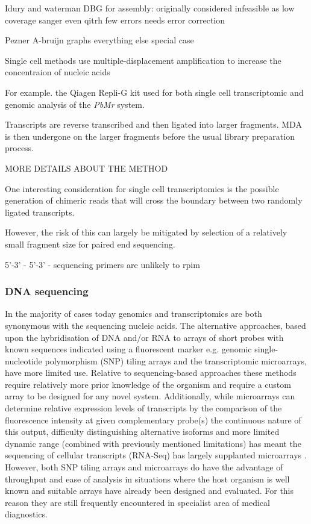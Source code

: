 Idury and waterman DBG for assembly: originally considered infeasible as low coverage
sanger even qitrh few errors needs error correction

Pezner A-bruijn graphs
everything else special case






Single cell methods use multiple-displacement amplification to increase the concentraion of
nucleic acids 

For example. the Qiagen Repli-G kit used for both single cell transcriptomic and genomic analysis
of the \textit{PbMr} system.

Transcripts are reverse transcribed and then ligated into larger fragments.  MDA
is then undergone on the larger fragments before the usual library preparation process.

MORE DETAILS ABOUT THE METHOD


One interesting consideration for single cell transcriptomics is the possible generation
of chimeric reads that will cross the boundary between two randomly ligated transcripts.

However, the risk of this can largely be mitigated by selection of a relatively small fragment
size for paired end sequencing.

5'-3' - 5'-3'  - sequencing primers are unlikely to rpim



\subsubsection{DNA sequencing}

In the majority of cases today genomics and transcriptomics are both synonymous with
the sequencing nucleic acids.  The alternative approaches, based upon the
hybridisation of DNA and/or RNA to arrays of short probes with known sequences indicated
using a fluorescent marker e.g. genomic single-nucleotide polymorphism (SNP) tiling arrays 
and the transcriptomic microarrays, have more limited use.  
Relative to sequencing-based approaches these methods
require relatively more prior knowledge of the organism and require a custom array to be
designed for any novel system. Additionally, while microarrays can determine relative expression levels
of transcripts by the comparison of the fluorescence intensity at given complementary probe(s)
the continuous nature of this output, difficulty distinguishing alternative isoforms 
and more limited dynamic range (combined with previously mentioned limitations) 
has meant the sequencing of cellular transcripts (RNA-Seq) has largely supplanted microarrays \citep{Wang2009}.
However, both SNP tiling arrays and microarrays do have the advantage of throughput and ease of analysis
in situations where the host organism is well known and suitable arrays have already been designed
and evaluated.  For this reason they are still frequently encountered in specialist area of medical 
diagnostics.


